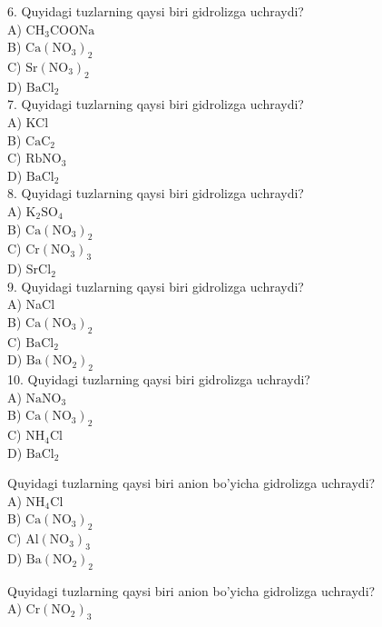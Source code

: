 6. Quyidagi tuzlarning qaysi biri gidrolizga uchraydi?\\
A) $\mathrm{CH}_{3} \mathrm{COONa}$\\
B) $\mathrm{Ca}\left(\mathrm{NO}_{3}\right)_{2}$\\
C) $\mathrm{Sr}\left(\mathrm{NO}_{3}\right)_{2}$\\
D) $\mathrm{BaCl}_{2}$\\
7. Quyidagi tuzlarning qaysi biri gidrolizga uchraydi?\\
A) KCl\\
B) $\mathrm{CaC}_{2}$\\
C) $\mathrm{RbNO}_{3}$\\
D) $\mathrm{BaCl}_{2}$\\
8. Quyidagi tuzlarning qaysi biri gidrolizga uchraydi?\\
A) $\mathrm{K}_{2} \mathrm{SO}_{4}$\\
B) $\mathrm{Ca}\left(\mathrm{NO}_{3}\right)_{2}$\\
C) $\mathrm{Cr}\left(\mathrm{NO}_{3}\right)_{3}$\\
D) $\mathrm{SrCl}_{2}$\\
9. Quyidagi tuzlarning qaysi biri gidrolizga uchraydi?\\
A) NaCl\\
B) $\mathrm{Ca}\left(\mathrm{NO}_{3}\right)_{2}$\\
C) $\mathrm{BaCl}_{2}$\\
D) $\mathrm{Ba}\left(\mathrm{NO}_{2}\right)_{2}$\\
10. Quyidagi tuzlarning qaysi biri gidrolizga uchraydi?\\
A) $\mathrm{NaNO}_{3}$\\
B) $\mathrm{Ca}\left(\mathrm{NO}_{3}\right)_{2}$\\
C) $\mathrm{NH}_{4} \mathrm{Cl}$\\
D) $\mathrm{BaCl}_{2}$
  \item Quyidagi tuzlarning qaysi biri anion bo'yicha gidrolizga uchraydi?\\
A) $\mathrm{NH}_{4} \mathrm{Cl}$\\
B) $\mathrm{Ca}\left(\mathrm{NO}_{3}\right)_{2}$\\
C) $\mathrm{Al}\left(\mathrm{NO}_{3}\right)_{3}$\\
D) $\mathrm{Ba}\left(\mathrm{NO}_{2}\right)_{2}$\\
  \item Quyidagi tuzlarning qaysi biri anion bo'yicha gidrolizga uchraydi?\\
A) $\mathrm{Cr}\left(\mathrm{NO}_{2}\right)_{3}$\\
